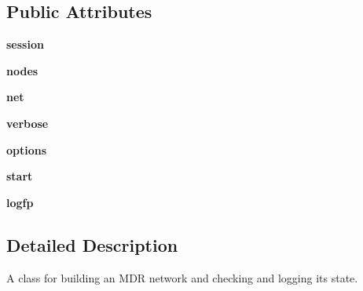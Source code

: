 \subsection*{Public Attributes}
\begin{DoxyCompactItemize}
\item 
\hypertarget{classospfmanetmdrtest_1_1_manet_experiment_aaac3e9bc0920224080f6e8802866d45f}{{\bfseries session}}\label{classospfmanetmdrtest_1_1_manet_experiment_aaac3e9bc0920224080f6e8802866d45f}

\item 
\hypertarget{classospfmanetmdrtest_1_1_manet_experiment_aa76bda33cc86f4265dbfa5aa20698938}{{\bfseries nodes}}\label{classospfmanetmdrtest_1_1_manet_experiment_aa76bda33cc86f4265dbfa5aa20698938}

\item 
\hypertarget{classospfmanetmdrtest_1_1_manet_experiment_a62e212202e21d586c97997af8fee8d5f}{{\bfseries net}}\label{classospfmanetmdrtest_1_1_manet_experiment_a62e212202e21d586c97997af8fee8d5f}

\item 
\hypertarget{classospfmanetmdrtest_1_1_manet_experiment_a22a204a3916f8e176a36f8191120dbe7}{{\bfseries verbose}}\label{classospfmanetmdrtest_1_1_manet_experiment_a22a204a3916f8e176a36f8191120dbe7}

\item 
\hypertarget{classospfmanetmdrtest_1_1_manet_experiment_a3bd962c6d23fecf5a94729aca0c4e370}{{\bfseries options}}\label{classospfmanetmdrtest_1_1_manet_experiment_a3bd962c6d23fecf5a94729aca0c4e370}

\item 
\hypertarget{classospfmanetmdrtest_1_1_manet_experiment_af74beafa39bf0d7e275d6b76f10342f6}{{\bfseries start}}\label{classospfmanetmdrtest_1_1_manet_experiment_af74beafa39bf0d7e275d6b76f10342f6}

\item 
\hypertarget{classospfmanetmdrtest_1_1_manet_experiment_a47816ae64c05f63e8eb9f3c00666eb3e}{{\bfseries logfp}}\label{classospfmanetmdrtest_1_1_manet_experiment_a47816ae64c05f63e8eb9f3c00666eb3e}

\end{DoxyCompactItemize}


\subsection{Detailed Description}
\begin{DoxyVerb}A class for building an MDR network and checking and logging its state.
\end{DoxyVerb}
 

